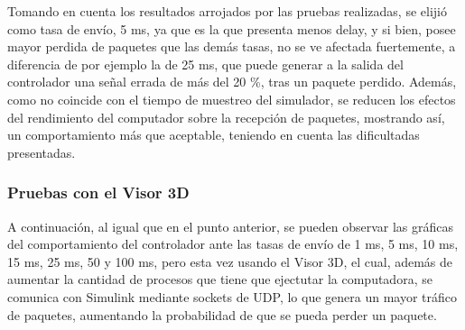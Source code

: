 \par Tomando en cuenta los resultados arrojados por las pruebas realizadas, se elijió como tasa de envío, 5 ms, ya que es la que presenta menos delay, y si bien, posee mayor perdida de paquetes que las demás tasas, no se ve afectada fuertemente, a diferencia de por ejemplo la de 25 ms, que puede generar a la salida del controlador una señal errada de más del 20 \%, tras un paquete perdido. Además, como no coincide con el tiempo de muestreo del simulador, se reducen los efectos del rendimiento del computador sobre la recepción de paquetes, mostrando así, un comportamiento más que aceptable, teniendo en cuenta las dificultadas presentadas.         

\subsubsection{Pruebas con el Visor 3D}  

A continuación, al igual que en el punto anterior, se pueden observar las gráficas del comportamiento del controlador ante las tasas de envío de 1 ms, 5 ms, 10 ms, 15 ms, 25 ms, 50 y 100 ms, pero esta vez usando el Visor 3D, el cual, además de aumentar la cantidad de procesos que tiene que ejectutar la computadora, se comunica con Simulink mediante sockets de UDP, lo que genera un mayor tráfico de paquetes, aumentando la probabilidad de que se pueda perder un paquete.   

